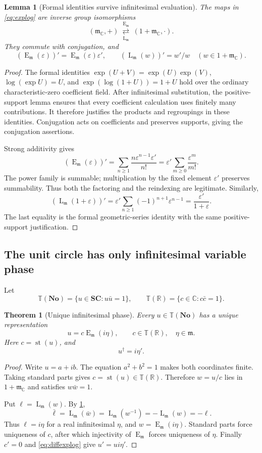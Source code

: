 \documentclass[11pt,letterpaper]{article}
\numberwithin{equation}{section}
\newtheorem{theorem}{Theorem}[section]
\newtheorem{lemma}[lemma]{Lemma}
\theoremstyle{definition}
\theoremstyle{remark}
\newcommand{\No}{\mathbf{No}}
\newcommand{\SC}{\mathbf{SC}}
\newcommand{\R}{\mathbb R}
\newcommand{\C}{\mathbb C}
\newcommand{\mm}{\mathfrak m}
\newcommand{\st}{\operatorname{st}}
\newcommand{\Em}{\operatorname{E}_{\mm}}
\newcommand{\Lm}{\operatorname{L}_{\mm}}
\newcommand{\ttt}{\mathbb T}
\newcommand{\eps}{\varepsilon}
\begin{document}
\begin{lemma}[Formal identities survive infinitesimal evaluation]\label{lem:explog}
The maps in \eqref{eq:explog} are inverse group isomorphisms
\[
 (\mm_\C,+)\ \underset{\Lm}{\overset{\Em}{\rightleftarrows}}\ (1+\mm_\C,\cdot).
\]
They commute with conjugation, and
\begin{equation}\label{eq:diffexplog}
 (\Em(\eps))'=\Em(\eps)\eps',\qquad
 (\Lm(w))'=w'/w\quad(w\in1+\mm_\C).
\end{equation}
\end{lemma}
\begin{proof}
The formal identities $\exp(U+V)=\exp(U)\exp(V)$, $\log(\exp U)=U$, and $\exp(\log(1+U))=1+U$ hold over the ordinary characteristic-zero coefficient field. After infinitesimal substitution, the positive-support lemma ensures that every coefficient calculation uses finitely many contributions. It therefore justifies the products and regroupings in these identities. Conjugation acts on coefficients and preserves supports, giving the conjugation assertions.

Strong additivity gives
\[
 (\Em(\eps))'
 =\sum_{n\geq1}\frac{n\eps^{n-1}\eps'}{n!}
 =\eps'\sum_{m\geq0}\frac{\eps^m}{m!}.
\]
The power family is summable; multiplication by the fixed element $\eps'$ preserves summability. Thus both the factoring and the reindexing are legitimate. Similarly,
\[
 (\Lm(1+\eps))'
 =\eps'\sum_{n\geq1}(-1)^{n+1}\eps^{n-1}
 =\frac{\eps'}{1+\eps}.
\]
The last equality is the formal geometric-series identity with the same positive-support justification.
\end{proof}

\subsection{The unit circle has only infinitesimal variable phase}
Let
\[
 \ttt(\No)=\{u\in\SC:u\bar u=1\},\qquad
 \ttt(\R)=\{c\in\C:c\bar c=1\}.
\]

\begin{theorem}[Unique infinitesimal phase]\label{thm:phase}
Every $u\in\ttt(\No)$ has a unique representation
\begin{equation}\label{eq:phase}
 u=c\Em(i\eta),\qquad c\in\ttt(\R),\quad\eta\in\mm.
\end{equation}
Here $c=\st(u)$, and
\begin{equation}\label{eq:phaseprime}
 u^\dagger=i\eta'.
\end{equation}
\end{theorem}
\begin{proof}
Write $u=a+ib$. The equation $a^2+b^2=1$ makes both coordinates finite. Taking standard parts gives $c=\st(u)\in\ttt(\R)$. Therefore $w=u/c$ lies in $1+\mm_\C$ and satisfies $w\bar w=1$.

Put $\ell=\Lm(w)$. By \cref{lem:explog},
\[
 \bar\ell=\Lm(\bar w)=\Lm(w^{-1})=-\Lm(w)=-\ell.
\]
Thus $\ell=i\eta$ for a real infinitesimal $\eta$, and $w=\Em(i\eta)$. Standard parts force uniqueness of $c$, after which injectivity of $\Em$ forces uniqueness of $\eta$. Finally $c'=0$ and \eqref{eq:diffexplog} give $u'=ui\eta'$.
\end{proof}
\end{document}
